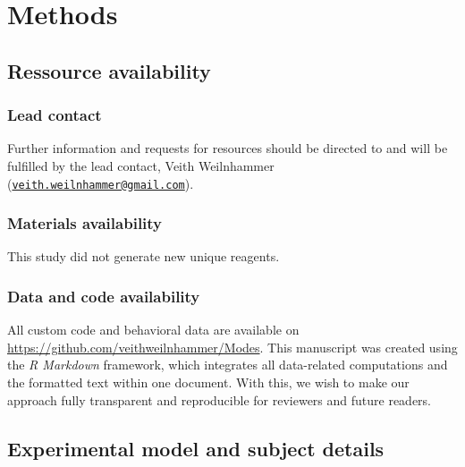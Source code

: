 \documentclass[
]{article}
\begin{document}
\newpage

\hypertarget{methods}{%
\section{Methods}\label{methods}}

\hypertarget{ressource-availability}{%
\subsection{Ressource availability}\label{ressource-availability}}

\hypertarget{lead-contact}{%
\subsubsection{Lead contact}\label{lead-contact}}

Further information and requests for resources should be directed to and
will be fulfilled by the lead contact, Veith Weilnhammer
(\href{mailto:veith.weilnhammer@gmail.com}{\nolinkurl{veith.weilnhammer@gmail.com}}).

\hypertarget{materials-availability}{%
\subsubsection{Materials availability}\label{materials-availability}}

This study did not generate new unique reagents.

\hypertarget{data-and-code-availability}{%
\subsubsection{Data and code
availability}\label{data-and-code-availability}}

All custom code and behavioral data are available on
\url{https://github.com/veithweilnhammer/Modes}. This manuscript was
created using the \emph{R Markdown} framework, which integrates all
data-related computations and the formatted text within one document.
With this, we wish to make our approach fully transparent and
reproducible for reviewers and future readers.

\hypertarget{experimental-model-and-subject-details}{%
\subsection{Experimental model and subject
details}\label{experimental-model-and-subject-details}}
\end{document}
